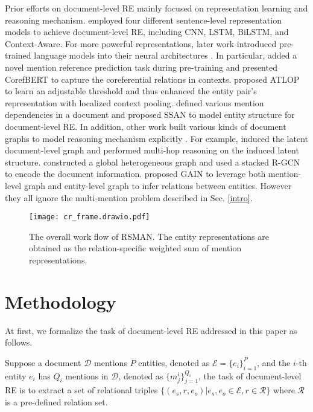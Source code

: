 \documentclass[11pt]{article}
\begin{document}
Prior efforts on document-level RE mainly focused on representation learning and reasoning mechanism. \citet{yao-etal-2019-docred} employed four different sentence-level representation models to achieve document-level RE, including {CNN}, {LSTM}, {BiLSTM}, and {Context-Aware}. For more powerful representations, later work introduced pre-trained language models into their neural architectures \cite{ye-etal-2020-coreferential,zhou2021document,xu2021entity}. In particular, \citet{ye-etal-2020-coreferential} added a novel mention reference prediction task during pre-training and presented {CorefBERT} to capture the coreferential relations in contexts. \citet{zhou2021document} proposed {ATLOP} to learn an adjustable threshold and thus enhanced the entity pair's representation with localized context pooling. \citet{xu2021entity} defined various mention dependencies in a document and proposed {SSAN} to model entity structure for document-level RE. In addition, other work built various kinds of document graphs to model reasoning mechanism explicitly
\cite{nan-etal-2020-reasoning,zeng-etal-2020-double,wang-etal-2020-global}. For example, \citet{nan-etal-2020-reasoning} induced the latent document-level
graph and performed multi-hop reasoning on the induced latent structure. \citet{wang-etal-2020-global} constructed a global heterogeneous
graph and used a stacked R-GCN \cite{schlichtkrull2018modeling} to encode the document information. \citet{zeng-etal-2020-double} proposed {GAIN} to leverage both mention-level graph
and entity-level graph to infer relations between
entities. However they all ignore the multi-mention problem described in Sec. \ref{intro}.

\begin{figure*}[t]
\centering
    \texttt{[image: cr\_frame.drawio.pdf]}
\caption{The overall work flow of RSMAN. The entity representations are obtained as the relation-specific weighted sum of mention representations.} \label{overview}
\end{figure*}

\section{Methodology}

At first, we formalize the task of document-level RE addressed in this paper as follows.



Suppose a document $\mathcal{D}$ mentions $P$ entities, denoted as $\mathcal{E}=\{{e_i}\}^{P}_{i=1}$, and the $i$-th entity $e_i$ has $Q_i$ mentions in $\mathcal{D}$, denoted as $\{{m^i_j}\}^{{Q_i}}_{j=1}$, the task of document-level RE is to extract a set of relational triples $\{(e_s,r,e_o)|e_s,e_o \in \mathcal{E},r \in \mathcal{R}\}$ where $\mathcal{R}$ is a pre-defined relation set.
\end{document}
